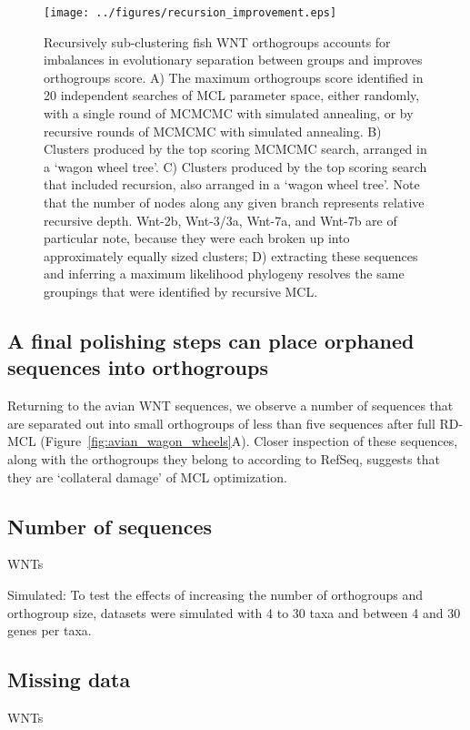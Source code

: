 \documentclass[twocolumn]{bmcart}  %
\begin{document}
\begin{figure}[t]
  \begin{center}
  \texttt{[image: ../figures/recursion\_improvement.eps]}
\end{center}
\caption{Recursively sub-clustering fish WNT orthogroups accounts for imbalances in evolutionary separation between groups and improves orthogroups score.
A) The maximum orthogroups score identified in 20 independent searches of MCL parameter space, either randomly, with a single round of MCMCMC with simulated annealing, or by recursive rounds of MCMCMC with simulated annealing.
B) Clusters produced by the top scoring MCMCMC search, arranged in a `wagon wheel tree'.
C) Clusters produced by the top scoring search that included recursion, also arranged in a `wagon wheel tree'.
Note that the number of nodes along any given branch represents relative recursive depth.
Wnt-2b, Wnt-3/3a, Wnt-7a, and Wnt-7b are of particular note, because they were each broken up into approximately equally sized clusters;
D) extracting these sequences and inferring a maximum likelihood phylogeny   resolves the same groupings that were identified by recursive MCL.}
\label{fig:recursion_improvement}
\end{figure}

\subsection{A final polishing steps can place orphaned sequences into orthogroups}\label{subsec:polish}
Returning to the avian WNT sequences, we observe a number of sequences that are separated out into small orthogroups of less than five sequences after full RD-MCL (Figure~\ref{fig:avian_wagon_wheels}A).
Closer inspection of these sequences, along with the orthogroups they belong to according to RefSeq, suggests that they are `collateral damage' of MCL optimization.




\subsection{Number of sequences}\label{subsec:number-of-sequences}
WNTs

Simulated: To test the effects of increasing the number of orthogroups and orthogroup size, datasets were simulated with 4 to 30 taxa and between 4 and 30 genes per taxa.


\subsection{Missing data}\label{subsec:missing-data}
WNTs
\end{document}
